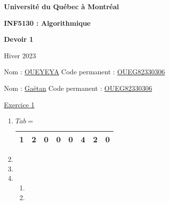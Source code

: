 \documentclass[11pt]{article}
\begin{document}
\thispagestyle{empty}

\begin{center}
\textbf{\Large Université du Qu\'ebec \`a Montr\'eal}

\bigskip
\bigskip

\textbf{\LARGE INF5130 : Algorithmique}

\bigskip
\bigskip
\bigskip

\textbf{\LARGE Devoir 1}

\vspace{0.5em}

\bigskip
\bigskip

\large

Hiver 2023

\bigskip

\normalsize

\bigskip
\bigskip

\end{center}





\rm

\bigskip
\bigskip

Nom : \underline{OUEYEYA} \hfill{}  Code permanent : \underline{OUEG82330306} 

\bigskip
\bigskip

Nom : \underline{Gaëtan} \hfill{}Code permanent : \underline{OUEG82330306} 


\newpage


\underline{Exercice 1} 
\begin{enumerate}[label=\Roman*.]
\item 

  $Tab=$ \begin{tabular}{|c|c|c|c|c|c|c|c|}
\hline
     1  & 2 & 0  &0 & 0 &4 & 2 &0 \\
    \hline
\end{tabular}






\item 
 

\item 



\item 

\begin{enumerate}[label=\alph*)]

     \item 
     
     \item 

\end{enumerate}

\end{enumerate}
\end{document}
